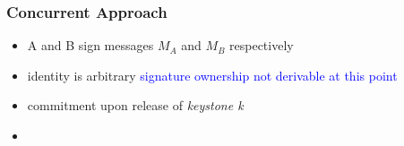 \begin{frame}
	\frametitle{Concurrent Approach}
	
	\begin{itemize}
		\setlength\itemsep{1em}
		\item A and B sign messages $M_A$ and $M_B$ respectively
		\item identity is arbitrary \textcolor{blue}{signature ownership not derivable at this point}
		\item commitment upon release of \textit{keystone k}
		\item 
	\end{itemize}
\end{frame}